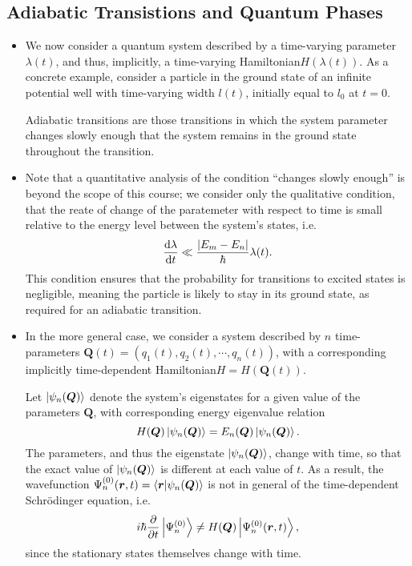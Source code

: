 \documentclass[11pt, a4paper]{article}
\newcommand{\Schro}{Schr\"{o}dinger\xspace}
\newcommand{\Ham}{Hamiltonian\xspace}
\renewcommand{\vec}[1]{\bm{#1}}  %
\renewcommand{\r}{\vec{r}}  %
\newcommand{\Q}{\vec{Q}}  %
\begin{document}
\subsection{Adiabatic Transistions and Quantum Phases}
\begin{itemize}
    \item We now consider a quantum system described by a time-varying parameter $ \lambda(t) $, and thus, implicitly, a time-varying \Ham $ H(\lambda(t)) $. As a concrete example, consider a particle in the ground state of an infinite potential well with time-varying width $ l(t) $, initially equal to $ l_{0} $ at $ t = 0 $. 

    Adiabatic transitions are those transitions in which the system parameter changes slowly enough that the system remains in the ground state throughout the transition. 

    \item Note that a quantitative analysis of the condition ``changes slowly enough'' is beyond the scope of this course; we consider only the qualitative condition, that the reate of change of the paratemeter with respect to time is small relative to the energy level between the system's states, i.e.
    \begin{equation*}
        \dv{\lambda}{t} \ll \frac{\abs{E_{m} - E_{n}}}{\hbar} \lambda(t).
    \end{equation*}
    This condition ensures that the probability for transitions to excited states is negligible, meaning the particle is likely to stay in its ground state, as required for an adiabatic transition.

    \item In the more general case, we consider a system described by $ n $ time-parameters $ \Q(t) = (q_{1}(t), q_{2}(t), \cdots, q_{n}(t)) $, with a corresponding implicitly time-dependent \Ham $ H = H(\Q(t)) $. 

    Let $ \ket{\psi_{n}(\Q)} $ denote the system's eigenstates for a given value of the parameters $ \Q $, with corresponding energy eigenvalue relation
    \begin{equation*}
        H(\Q) \ket{\psi_{n}(\Q)} = E_{n}(\Q) \ket{\psi_{n}(\Q)}.
    \end{equation*}
    The parameters, and thus the eigenstate $ \ket{\psi_{n}(\Q)} $, change with time, so that the exact value of $ \ket{\psi_{n}(\Q)} $ is different at each value of $ t $. As a result, the wavefunction $ \Psi_{n}^{(0)}(\r, t) = \braket{\r}{\psi_{n}(\Q)} $ is not in general of the time-dependent \Schro equation, i.e.
    \begin{equation*}
        i \hbar \pdv{t} \ket{\Psi_{n}^{(0)}} \neq H(\Q) \ket{\Psi_{n}^{(0)}(\r, t)},
    \end{equation*}
    since the stationary states themselves change with time.
    

\end{itemize}
\end{document}
